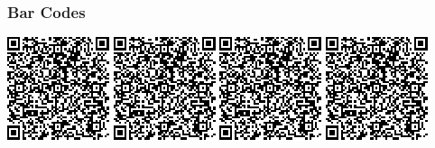 \begin{frame}[fragile]
\frametitle{Bar Codes}

\includegraphics[page=1]{images/talk-pics}\;
\includegraphics[page=2]{images/talk-pics}\;
\includegraphics[page=3]{images/talk-pics}\;
\includegraphics[page=4]{images/talk-pics}

\end{frame}
